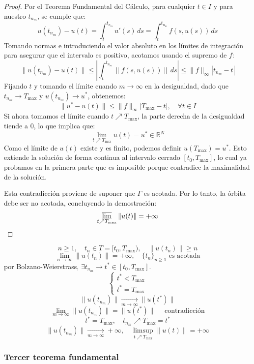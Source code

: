 \begin{proof}
    Por el Teorema Fundamental del Cálculo, para cualquier $t \in I$ y para nuestro $t_{n_m}$, se cumple que:
    \[
        u(t_{n_m}) - u(t) = \int_t^{t_{n_m}} u'(s) \, ds = \int_t^{t_{n_m}} f(s, u(s)) \, ds
    \]
    Tomando normas e introduciendo el valor absoluto en los límites de integración para asegurar que el intervalo es positivo, acotamos usando el supremo de $f$:
    \[
        \| u(t_{n_m}) - u(t) \| \leq \left| \int_t^{t_{n_m}} \| f(s, u(s)) \| \, ds \right| \leq \| f \|_\infty | t_{n_m} - t |
    \]
    Fijando $t$ y tomando el límite cuando $m \to \infty$ en la desigualdad, dado que $t_{n_m} \to T_{\text{max}}$ y $u(t_{n_m}) \to u^*$, obtenemos:
    \[
        \| u^* - u(t) \| \leq \| f \|_\infty | T_{\text{max}} - t |, \quad \forall t \in I
    \]
    Si ahora tomamos el límite cuando $t \nearrow T_{\text{max}}$, la parte derecha de la desigualdad tiende a $0$, lo que implica que:
    \[
        \lim_{t \nearrow T_{\text{max}}} u(t) = u^* \in \mathbb{R}^N
    \]
    Como el límite de $u(t)$ existe y es finito, podemos definir $u(T_{\text{max}}) = u^*$. Esto extiende la solución de forma continua al intervalo cerrado $[t_0, T_{\text{max}}]$, lo cual ya probamos en la primera parte que es imposible porque contradice la maximalidad de la solución.
    
    Esta contradicción proviene de suponer que $\Gamma$ es acotada. Por lo tanto, la órbita debe ser no acotada, concluyendo la demostración:
    \[
        \varlimsup_{t \nearrow T_{\text{max}}} \| u(t) \| = +\infty
    \]
\end{proof}

\[
    n \geq 1, \quad t_n \in T = [t_0, T_{\text{max}}), \quad \| u(t_n) \| \geq n
\]
\[
    \lim_{n \to \infty} \| u(t_n) \| = +\infty, \quad \{t_n\}_{n \geq 1} \text{ es acotada} 
\]
por Bolzano-Weierstrass, $\exists t_{n_m} \to t^* \in [t_0, T_{\text{max}}]$.
\[
    \begin{cases}
        t^* < T_{\text{max}} \\
        t^* = T_{\text{max}}
    \end{cases}
\]
\[
    \| u(t_{n_m}) \| \xrightarrow[m \to \infty]{} \| u(t^*) \| 
\]
\[
    \lim_{m \to \infty} \| u(t_{n_m}) \| = \| u(t^*) \| \quad \text{ contradicción}
\]
\[
    t^* = T_{\text{max}}, \quad t_{n_m} \nearrow T_{\text{max}} = t^*
\]
\[
    \| u(t_{n_m}) \| \xrightarrow[m \to \infty]{} +\infty, \quad \limsup_{t \nearrow T_{\text{max}}} \| u(t) \| = +\infty
\]

\subsubsection{Tercer teorema fundamental}

